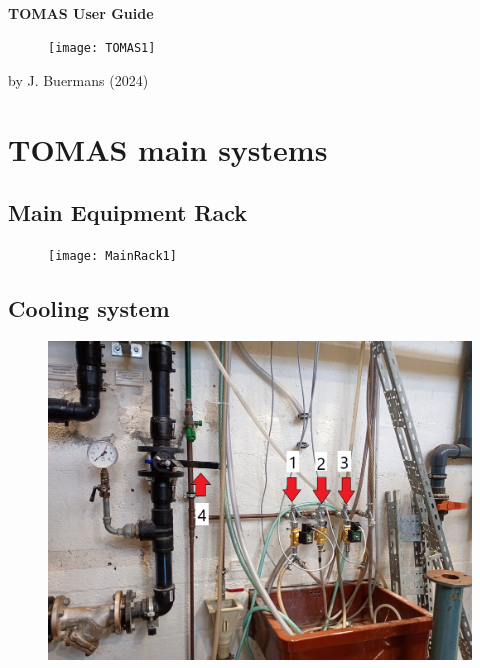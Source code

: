 \documentclass[fleqn,a4paper,20pt]{article}
\begin{document}
\begin{center}
$\ $\\

	
{\Huge \textbf{ TOMAS User Guide}}

\vspace{3.0cm}

\begin{figure}[h!]
	\centering
	\texttt{[image: TOMAS1]}
\end{figure}


\vspace{3.0cm}
\end{center}

\begin{flushright}{by J. Buermans (2024)} \end{flushright}

\newpage
\section{TOMAS main systems}%


\subsection{Main Equipment Rack}

\begin{figure}[h!]
	\centering
	\texttt{[image: MainRack1]}
\end{figure}


\newpage
\subsection{Cooling system}

\begin{figure}[h!]
	\centering
	\includegraphics[width=\linewidth]{Cool2}
\end{figure}
\end{document}
